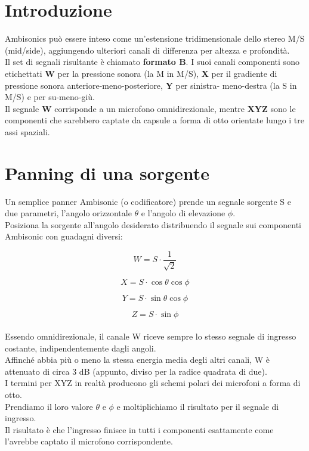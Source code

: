   \section{Introduzione}
Ambisonics può essere inteso come un'estensione tridimensionale dello stereo M/S (mid/side),
aggiungendo ulteriori canali di differenza per altezza e profondità.\\
Il set di segnali risultante è chiamato \textbf{formato B}.
I suoi canali componenti sono etichettati \textbf{W} per la pressione sonora (la M in M/S),
\textbf{X} per il gradiente di pressione sonora anteriore-meno-posteriore, 
\textbf{Y} per sinistra- meno-destra (la S in M/S) e  per su-meno-giù. \\
Il segnale \textbf{W} corrisponde a un microfono omnidirezionale,
mentre \textbf{XYZ} sono le componenti che sarebbero captate da
capsule a forma di otto orientate lungo i tre assi spaziali.

\section{Panning di una sorgente}
Un semplice panner Ambisonic (o codificatore) prende un segnale sorgente S e due parametri,
 l'angolo orizzontale $\theta$ e l'angolo di elevazione $\phi$.\\
 Posiziona la sorgente all'angolo desiderato distribuendo il segnale sui 
 componenti Ambisonic con guadagni diversi:

 \begin{equation}
W =S\cdot\frac{1}{\sqrt{2}}
 \end{equation}

 \begin{equation}
      X=S\cdot\cos\theta\cos\phi
\end{equation}

\begin{equation}
      Y =S\cdot\sin\theta\cos\phi
\end{equation}

\begin{equation}
      Z=S\cdot\sin\phi
\end{equation}
\\

Essendo omnidirezionale, il canale W riceve sempre lo stesso segnale di ingresso costante, indipendentemente dagli angoli. \\
Affinché abbia più o meno la stessa energia media degli altri canali, W è attenuato di circa 3 dB (appunto, diviso per la radice quadrata di due).\\
 I termini per XYZ in realtà producono gli schemi polari dei microfoni a forma di otto. \\ 
 Prendiamo il loro valore $\theta$ e $\phi$ e moltiplichiamo il risultato per il segnale di ingresso.\\
  Il risultato è che l'ingresso finisce in tutti i componenti esattamente come l'avrebbe captato il microfono corrispondente.

